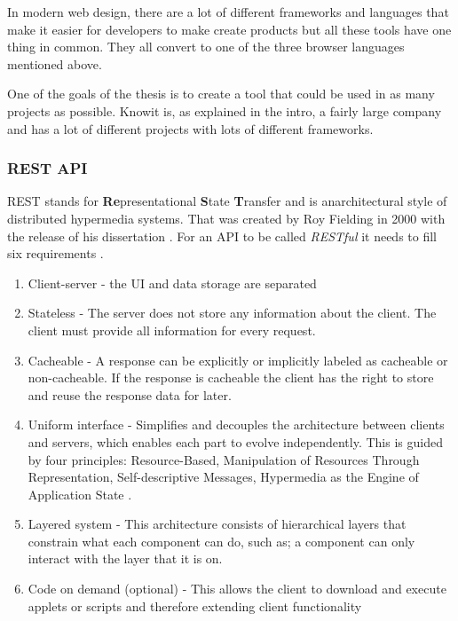 In modern web design, there are a lot of different frameworks and languages that make it easier for developers to make create products but all these tools have one thing in common. They all convert to one of the three browser languages mentioned above. 

One of the goals of the thesis is to create a tool that could be used in as many projects as possible. Knowit is, as explained in the intro, a fairly large company and has a lot of different projects with lots of different frameworks.   


\subsubsection{REST API}%
\label{sub:REST API}
REST stands for \textbf{Re}presentational \textbf{S}tate \textbf{T}ransfer and is anarchitectural style of distributed hypermedia systems. That was created by Roy Fielding in 2000 with the release of his dissertation \cite{fieldingFieldingDissertationCHAPTER}. For an API to be called \textit{RESTful} it needs to fill six requirements \cite{restfulapi.netWhatREST}.
\begin{enumerate}
  \item Client-server - the UI and data storage are separated
  \item Stateless -  The server does not store any information about the client. The client must provide all information for every request. 
  \item Cacheable - A response can be explicitly or implicitly labeled as cacheable or non-cacheable. If the response is cacheable the client has the right to store and reuse the response data for later.
  \item Uniform interface - Simplifies and decouples the architecture between clients and servers, which enables each part to evolve independently. This is guided by four principles: Resource-Based, Manipulation of Resources Through Representation, Self-descriptive Messages, Hypermedia as the Engine of Application State \cite{WhatREST}.
  \item Layered system -  This architecture consists of hierarchical layers that constrain what each component can do, such as; a component can only interact with the layer that it is on.
  \item  Code on demand (optional) - This allows the client to download and execute applets or scripts and therefore extending client functionality
\end{enumerate}



